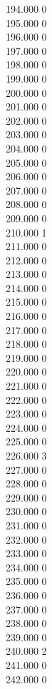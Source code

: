 { 194.000	0 \\
 195.000	0 \\
 196.000	0 \\
 197.000	0 \\
 198.000	0 \\
 199.000	0 \\
 200.000	0 \\
 201.000	0 \\
 202.000	0 \\
 203.000	0 \\
 204.000	0 \\
 205.000	0 \\
 206.000	0 \\
 207.000	0 \\
 208.000	0 \\
 209.000	0 \\
 210.000	1 \\
 211.000	0 \\
 212.000	0 \\
 213.000	0 \\
 214.000	0 \\
 215.000	0 \\
 216.000	0 \\
 217.000	0 \\
 218.000	0 \\
 219.000	0 \\
 220.000	0 \\
 221.000	0 \\
 222.000	0 \\
 223.000	0 \\
 224.000	0 \\
 225.000	0 \\
 226.000	3 \\
 227.000	0 \\
 228.000	0 \\
 229.000	0 \\
 230.000	0 \\
 231.000	0 \\
 232.000	0 \\
 233.000	0 \\
 234.000	0 \\
 235.000	0 \\
 236.000	0 \\
 237.000	0 \\
 238.000	0 \\
 239.000	0 \\
 240.000	2 \\
 241.000	0 \\
 242.000	0 \\
}
